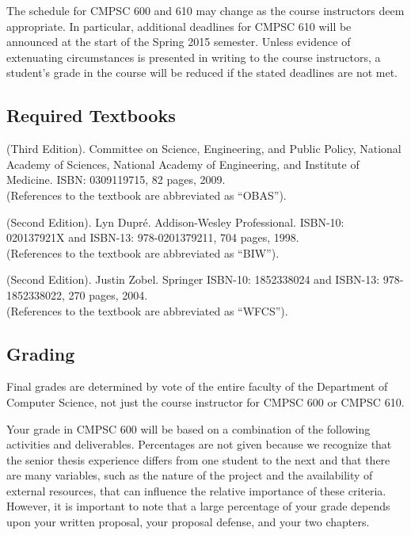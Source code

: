 \noindent The schedule for CMPSC 600 and 610 may change as the course instructors deem appropriate. In particular,
additional deadlines for CMPSC 610 will be announced at the start of the Spring 2015 semester. Unless evidence of
extenuating circumstances is presented in writing to the course instructors, a student's grade in the course will be
reduced if the stated deadlines are not met.

\vspace{-.15in}
\subsection*{Required Textbooks}

 (Third Edition).  Committee on Science,
Engineering, and Public Policy, National Academy of Sciences, National Academy of Engineering, and Institute of
Medicine. ISBN: 0309119715, 82 pages, 2009.\\ (References to the textbook are abbreviated as ``OBAS'').

 (Second Edition). Lyn Dupr\'e.  Addison-Wesley
Professional.  ISBN-10: 020137921X and ISBN-13: 978-0201379211, 704 pages, 1998.\\ (References to the textbook are
abbreviated as ``BIW'').

 (Second Edition).  Justin Zobel.  Springer ISBN-10: 1852338024 and ISBN-13:
978-1852338022, 270 pages, 2004. \\ (References to the textbook are abbreviated as ``WFCS'').

\vspace*{-.15in}
\subsection*{Grading}

Final grades are determined by vote of the entire faculty of the Department of Computer Science, not just the course instructor
for CMPSC 600 or CMPSC 610.

Your grade in CMPSC 600 will be based on a combination of the following activities and deliverables. Percentages are not
given because we recognize that the senior thesis experience differs from one student to the next and that there are many
variables, such as the nature of the project and the availability of external resources, that can influence the relative
importance of these criteria. However, it is important to note that a large percentage of your grade depends upon your
written proposal, your proposal defense, and your two chapters.

